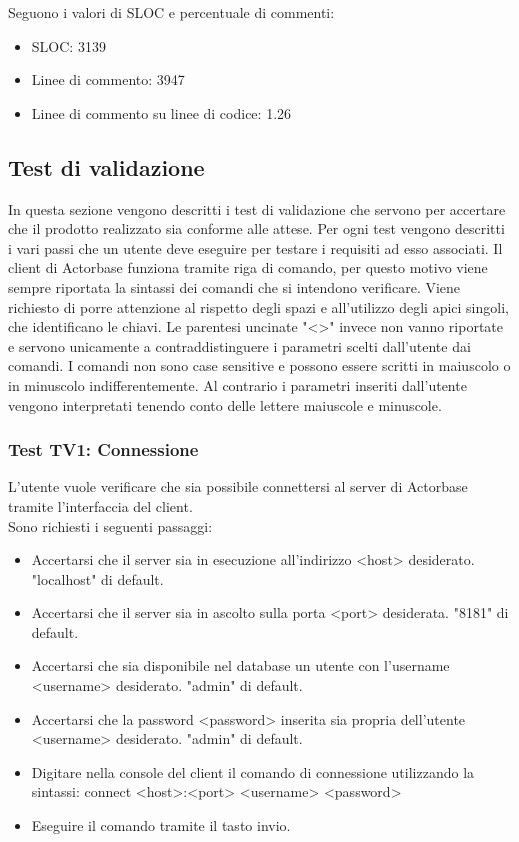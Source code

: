 \documentclass[a4paper]{article}
\begin{document}
		
		Seguono i valori di SLOC e percentuale di commenti:
		\begin{itemize}
			\item SLOC: 3139
			\item Linee di commento: 3947
			\item Linee di commento su linee di codice: 1.26
		\end{itemize}
			



	\subsection{Test di validazione}
		In questa sezione vengono descritti i test di validazione che servono per accertare che il prodotto realizzato sia conforme alle attese. 
		Per ogni test vengono descritti i vari passi che un utente deve eseguire per testare i requisiti ad esso associati.
		Il client di Actorbase funziona tramite riga di comando, per questo motivo viene sempre riportata la sintassi dei comandi che si intendono verificare.
		Viene richiesto di porre attenzione al rispetto degli spazi e all'utilizzo degli apici singoli, che identificano le chiavi.
		Le parentesi uncinate "<>" invece non vanno riportate e servono unicamente a contraddistinguere i parametri scelti dall'utente dai comandi.
		I comandi non sono case sensitive e possono essere scritti in maiuscolo o in minuscolo indifferentemente. 
		Al contrario i parametri inseriti dall'utente vengono interpretati tenendo conto delle lettere maiuscole e minuscole.
		
		\subsubsection{Test TV1: Connessione}
		L'utente vuole verificare che sia possibile connettersi al server di Actorbase tramite l'interfaccia del client. \\
		Sono richiesti i seguenti passaggi:
		\begin{itemize}
			\item Accertarsi che il server sia in esecuzione all'indirizzo <host> desiderato. "localhost" di default.
			\item Accertarsi che il server sia in ascolto sulla porta <port> desiderata. "8181" di default.
			\item Accertarsi che sia disponibile nel database un utente con l'username <username> desiderato. "admin" di default.
			\item Accertarsi che la password <password> inserita sia propria dell'utente <username> desiderato. "admin" di default.
			\item Digitare nella console del client il comando di connessione utilizzando la sintassi: connect <host>:<port> <username> <password>
			\item Eseguire il comando tramite il tasto invio.
		\end{itemize}
		
\end{document}
